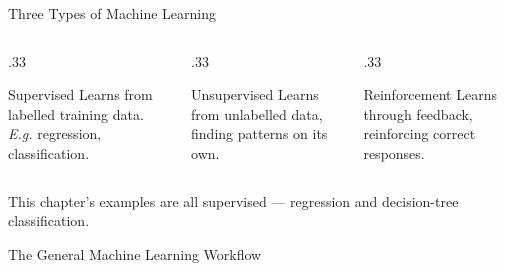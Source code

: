 \documentclass[9pt,aspectratio=169,xcolor=table]{beamer}
\begin{document}
\begin{frame}{Three Types of Machine Learning}
    \leavevmode
    \small
    \begin{columns}[t]
        \begin{column}{.33\textwidth}
            \begin{block}{Supervised}
                \scriptsize Learns from \alert{labelled} training data.
                \emph{E.g.} regression, classification.
            \end{block}
        \end{column}
        \begin{column}{.33\textwidth}
            \begin{block}{Unsupervised}
                \scriptsize Learns from \alert{unlabelled} data, finding
                patterns on its own.
            \end{block}
        \end{column}
        \begin{column}{.33\textwidth}
            \begin{block}{Reinforcement}
                \scriptsize Learns through \alert{feedback}, reinforcing
                correct responses.
            \end{block}
        \end{column}
    \end{columns}

    \vspace{3mm}
    {\small This chapter's examples are all \alert{supervised} ---
    regression and decision-tree classification.}
\end{frame}

\begin{frame}{The General Machine Learning Workflow}
    \leavevmode
    \begin{center}
    \end{center}

\end{frame}

\end{document}
